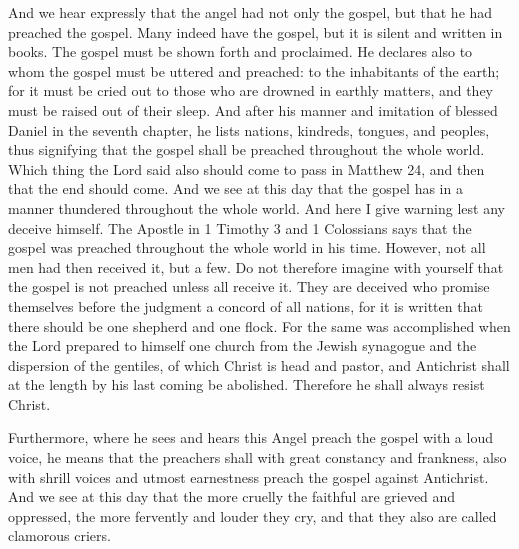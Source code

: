 And we hear expressly that the angel had not only the gospel, but that he had preached the gospel. Many indeed have the gospel, but it is silent and written in books. The gospel must be shown forth and proclaimed. He declares also to whom the gospel must be uttered and preached: to the inhabitants of the earth; for it must be cried out to those who are drowned in earthly matters, and they must be raised out of their sleep. And after his manner and imitation of blessed Daniel in the seventh chapter, he lists nations, kindreds, tongues, and peoples, thus signifying that the gospel shall be preached throughout the whole world. Which thing the Lord said also should come to pass in Matthew 24, and then that the end should come. And we see at this day that the gospel has in a manner thundered throughout the whole world. And here I give warning lest any deceive himself. The Apostle in 1 Timothy 3 and 1 Colossians says that the gospel was preached throughout the whole world in his time. However, not all men had then received it, but a few. Do not therefore imagine with yourself that the gospel is not preached unless all receive it. They are deceived who promise themselves before the judgment a concord of all nations, for it is written that there should be one shepherd and one flock. For the same was accomplished when the Lord prepared to himself one church from the Jewish synagogue and the dispersion of the gentiles, of which Christ is head and pastor, and Antichrist shall at the length by his last coming be abolished. Therefore he shall always resist Christ.

Furthermore, where he sees and hears this Angel preach the gospel with a loud voice, he means that the preachers shall with great constancy and frankness, also with shrill voices and utmost earnestness preach the gospel against Antichrist. And we see at this day that the more cruelly the faithful are grieved and oppressed, the more fervently and louder they cry, and that they also are called clamorous criers.

